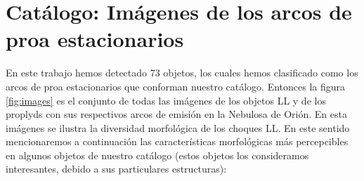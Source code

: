 \section{Catálogo: Imágenes de los arcos de proa estacionarios}
\label{sec:images}

En este trabajo hemos detectado 73 objetos, los cuales hemos clasificado como los arcos de proa estacionarios que conforman nuestro catálogo. Entonces la  figura \ref{fig:images} es el conjunto de todas las imágenes de los objetos LL y de los proplyds con sus respectivos arcos de emisión en la Nebulosa de Orión. En esta imágenes se ilustra la diversidad morfológica de los choques LL. En este sentido mencionaremos a continuación  las características morfológicas más percepcibles en algunos objetos de nuestro catálogo (estos objetos los consideramos interesantes, debido a sus particulares estructuras):\\

